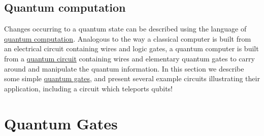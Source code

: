 \documentclass{article}
\begin{document}
\subsection{Quantum computation}
Changes occurring to a quantum state can be described using the language of \underline{quantum computation}. Analogous to the way a classical computer is built from an electrical circuit
containing wires and logic gates, a quantum computer is built from a \underline{quantum circuit} containing wires and elementary quantum gates to carry around and manipulate the
quantum information. In this section we describe some simple \underline{quantum gates}, and present several example circuits illustrating their application, including a circuit which teleports
qubits!
\section{Quantum Gates}
\label{Quantum Gates}
\end{document}
